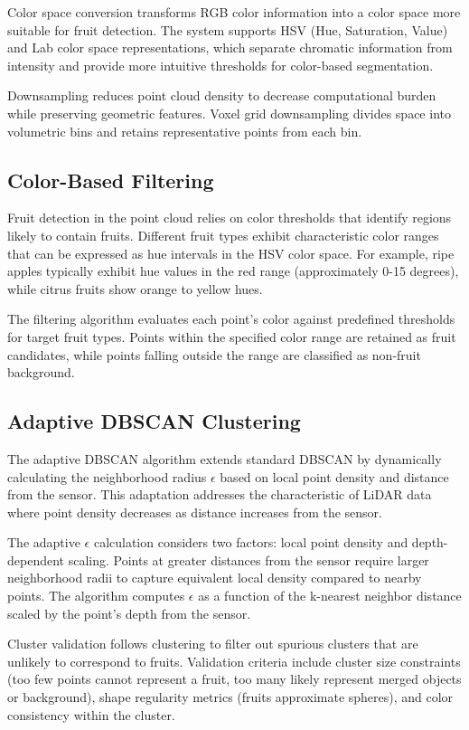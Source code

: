 Color space conversion transforms RGB color information into a color space more suitable for fruit detection. The system supports HSV (Hue, Saturation, Value) and Lab color space representations, which separate chromatic information from intensity and provide more intuitive thresholds for color-based segmentation.

Downsampling reduces point cloud density to decrease computational burden while preserving geometric features. Voxel grid downsampling divides space into volumetric bins and retains representative points from each bin.

\subsection{Color-Based Filtering}
Fruit detection in the point cloud relies on color thresholds that identify regions likely to contain fruits. Different fruit types exhibit characteristic color ranges that can be expressed as hue intervals in the HSV color space. For example, ripe apples typically exhibit hue values in the red range (approximately 0-15 degrees), while citrus fruits show orange to yellow hues.

The filtering algorithm evaluates each point's color against predefined thresholds for target fruit types. Points within the specified color range are retained as fruit candidates, while points falling outside the range are classified as non-fruit background.

\subsection{Adaptive DBSCAN Clustering}
The adaptive DBSCAN algorithm extends standard DBSCAN by dynamically calculating the neighborhood radius $\epsilon$ based on local point density and distance from the sensor. This adaptation addresses the characteristic of LiDAR data where point density decreases as distance increases from the sensor.

The adaptive $\epsilon$ calculation considers two factors: local point density and depth-dependent scaling. Points at greater distances from the sensor require larger neighborhood radii to capture equivalent local density compared to nearby points. The algorithm computes $\epsilon$ as a function of the k-nearest neighbor distance scaled by the point's depth from the sensor.

Cluster validation follows clustering to filter out spurious clusters that are unlikely to correspond to fruits. Validation criteria include cluster size constraints (too few points cannot represent a fruit, too many likely represent merged objects or background), shape regularity metrics (fruits approximate spheres), and color consistency within the cluster.

